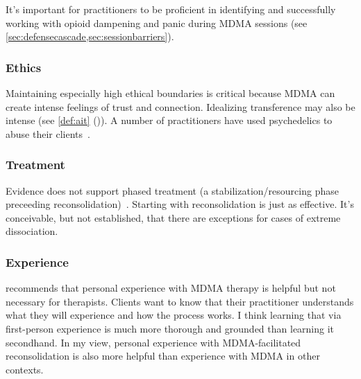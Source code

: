 \documentclass[11pt,oneside]{book}
\let\cite\parencite
\newcommand{\combinedcref}[1]{\cref{#1} (\nameref*{#1})} %
\begin{document}
It's important for practitioners to be proficient in identifying and successfully working with opioid dampening and panic during MDMA sessions (see \cref{sec:defensecascade,sec:sessionbarriers}).

\subsubsection*{Ethics}
Maintaining especially high ethical boundaries is critical because MDMA can create intense feelings of trust and connection. Idealizing transference may also be intense (see \combinedcref{def:ait}). A number of practitioners have used psychedelics to abuse their clients~\cite{hallMad,davidsonEisner}.

\subsubsection*{Treatment}
Evidence does not support phased treatment (a stabilization/resourcing phase preceeding reconsolidation)~\cite{selePhased,oprelPhased,vlietPhased}. Starting with reconsolidation is just as effective. It's conceivable, but not established, that there are exceptions for cases of extreme dissociation.

\subsubsection*{Experience}
\textcite{simmering} recommends that personal experience with MDMA therapy is helpful but not necessary for therapists. Clients want to know that their practitioner understands what they will experience and how the process works. I think learning that via first-person experience is much more thorough and grounded than learning it secondhand. In my view, personal experience with MDMA-facilitated reconsolidation is also more helpful than experience with MDMA in other contexts.
\end{document}

